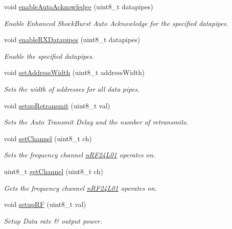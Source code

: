 \begin{DoxyCompactItemize}
void \hyperlink{classn_r_f24_l01_a7711544550f7e550c7d237c707733e4e}{enable\-Auto\-Acknowledge} (uint8\-\_\-t datapipes)
\begin{DoxyCompactList}\small\item\em Enable Enhanced Shock\-Burst Auto Acknowledge for the specified datapipes. \end{DoxyCompactList}\item 
void \hyperlink{classn_r_f24_l01_aa2ef2be88d4802495172126b1824d1ec}{enable\-R\-X\-Datapipes} (uint8\-\_\-t datapipes)
\begin{DoxyCompactList}\small\item\em Enable the specified datapipes. \end{DoxyCompactList}\item 
void \hyperlink{classn_r_f24_l01_a0bc2975ae5cdbf1438cd391260349f64}{set\-Address\-Width} (uint8\-\_\-t address\-Width)
\begin{DoxyCompactList}\small\item\em Sets the width of addresses for all data pipes. \end{DoxyCompactList}\item 
void \hyperlink{classn_r_f24_l01_a722dc7a3e25964386acc815ce35cda46}{setup\-Retransmit} (uint8\-\_\-t val)
\begin{DoxyCompactList}\small\item\em Sets the Auto Transmit Delay and the number of retransmits. \end{DoxyCompactList}\item 
void \hyperlink{classn_r_f24_l01_ad51e0ef24f71b5155f80cd9abb752fc4}{set\-Channel} (uint8\-\_\-t ch)
\begin{DoxyCompactList}\small\item\em Sets the frequency channel \hyperlink{classn_r_f24_l01}{n\-R\-F24\-L01} operates on. \end{DoxyCompactList}\item 
uint8\-\_\-t \hyperlink{classn_r_f24_l01_a835d79477f6d01ce0a0fb865799a2b01}{get\-Channel} (uint8\-\_\-t ch)
\begin{DoxyCompactList}\small\item\em Gets the frequency channel \hyperlink{classn_r_f24_l01}{n\-R\-F24\-L01} operates on. \end{DoxyCompactList}\item 
void \hyperlink{classn_r_f24_l01_a539b8247127dd40fe71902d16c696633}{setup\-R\-F} (uint8\-\_\-t val)
\begin{DoxyCompactList}\small\item\em Setup Data rate \& output power. \end{DoxyCompactList}\item 

\end{DoxyCompactItemize}
